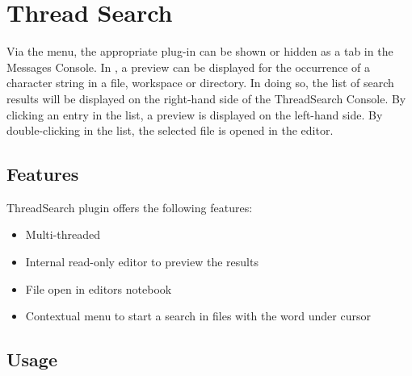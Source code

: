 \section{Thread Search}\label{sec:thread_search}

Via the  menu, the appropriate plug-in can be shown or hidden as a tab in the Messages Console. In \codeblocks, a preview can be displayed for the occurrence of a character string in a file, workspace or directory. In doing so, the list of search results will be displayed on the right-hand side of the ThreadSearch Console. By clicking an entry in the list, a preview is displayed on the left-hand side. By double-clicking in the list, the selected file is opened in the \codeblocks editor.


\subsection{Features}

ThreadSearch plugin offers the following features:

\begin{itemize}
\item Multi-threaded 
\item Internal read-only editor to preview the results
\item File open in editors notebook
\item Contextual menu  to start a search in files with the word under cursor
\end{itemize}


\subsection{Usage}

